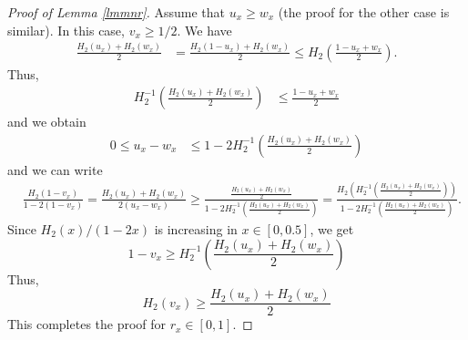 \documentclass[conference,letterpaper,onecolumn]{IEEEtran}
\theoremstyle{plain}%
\begin{document}
\begin{proof}[Proof of Lemma \ref{lmmnr}]

 Assume that $u_x\geq w_x$ (the proof for the other case is similar). In this case, $v_x\geq 1/2$. We have
{\begin{align*}
    \frac{H_2(u_x) + H_2(w_x)}{2}&=\frac{H_2(1-u_x) + H_2(w_x)}{2}\leq H_2\left(\frac{1-u_x+w_x}{2}\right).
\end{align*}}
Thus,
\begin{align*}
H_2^{-1}\left(\frac{H_2(u_x) + H_2(w_x)}{2}\right)&\leq \frac{1-u_x+w_x}{2}
\end{align*}
and we obtain
\begin{align*}
    0\leq u_x-w_x&\leq 1-2H_2^{-1}\left(\frac{H_2(u_x) + H_2(w_x)}{2}\right)
\end{align*}
and we can write
{\begin{align*}
    &\frac{H_2(1-v_x)}{1-2(1-v_x)} = \frac{H_2(u_x) + H_2(w_x)}{2(u_x-w_x)}\geq \frac{\frac{H_2(u_x) + H_2(w_x)}{2}}{1-2H_2^{-1}(\frac{H_2(u_x) + H_2(w_x)}{2})}=\frac{H_2(H_2^{-1}(\frac{H_2(u_x) + H_2(w_x)}{2}))}{1-2H_2^{-1}(\frac{H_2(u_x) + H_2(w_x)}{2})}.
\end{align*}}
Since $H_2(x)/(1-2x)$ is increasing in $x\in[0,0.5]$, we get 
$$1-v_x\geq H_2^{-1}(\frac{H_2(u_x) + H_2(w_x)}{2})$$
Thus,
$$H_2(v_x)\geq \frac{H_2(u_x) + H_2(w_x)}{2}$$
This completes the proof for $r_x\in[0,1]$.


\end{proof}
\end{document}
